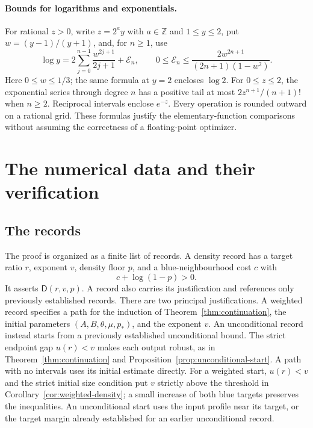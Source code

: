 \documentclass[11pt]{article}
\theoremstyle{definition}
\theoremstyle{remark}
\newcommand{\D}{\mathsf D}
\numberwithin{equation}{section}
\begin{document}
\paragraph{Bounds for logarithms and exponentials.}
For rational $z>0$, write $z=2^a y$ with $a\in\mathbb Z$ and
$1\le y\le2$, put $w=(y-1)/(y+1)$, and, for $n\ge1$, use
\[
 \log y=2\sum_{j=0}^{n-1}\frac{w^{2j+1}}{2j+1}+\mathcal E_n,
 \qquad
 0\le\mathcal E_n\le\frac{2w^{2n+1}}{(2n+1)(1-w^2)}.
\]
Here $0\le w\le1/3$; the same formula at $y=2$ encloses $\log2$. For $0\le z\le2$, the exponential series through degree $n$ has a positive tail at most $2z^{n+1}/(n+1)!$ when $n\ge2$. Reciprocal intervals enclose $e^{-z}$. Every operation is rounded outward on a rational grid. These formulas justify the elementary-function comparisons without assuming the correctness of a floating-point optimizer.

\section{The numerical data and their verification}\label{app:data}

\subsection{The records}

The proof is organized as a finite list of records. A density record has a target ratio $r$, exponent $v$, density floor $p$, and a blue-neighbourhood cost $c$ with
\[
 c+\log(1-p)>0.
\]
It asserts $\D(r,v,p)$. A record also carries its justification and
references only previously established records. There are two
principal justifications. A weighted record specifies a path for the
induction of Theorem~\ref{thm:continuation}, the initial parameters
$(A,B,\theta,\mu,p_*)$, and the exponent $v$. An unconditional record
instead starts from a previously established unconditional bound.
The strict endpoint gap $u(r)<v$ makes each output robust, as in
Theorem~\ref{thm:continuation} and
Proposition~\ref{prop:unconditional-start}. A path with no intervals
uses its initial estimate directly. For a weighted start, $u(r)<v$
and the strict initial size condition put $v$ strictly above the
threshold in Corollary~\ref{cor:weighted-density}; a small increase
of both blue targets preserves the inequalities. An unconditional
start uses the input profile near its target, or the target margin
already established for an earlier unconditional record.
\end{document}
